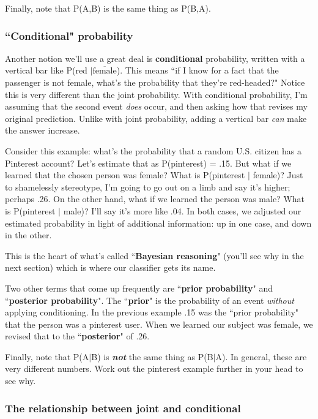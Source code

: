 \documentclass[12pt]{article}
\begin{document}
Finally, note that P(A,B) is the same thing as P(B,A).

\subsubsection{``Conditional" probability}

Another notion we'll use a great deal is \textbf{conditional} probability,
written with a vertical bar like P(red $| \overline{\textrm{female}}$). This
means ``if I know for a fact that the passenger is not female, what's the
probability that they're red-headed?" Notice this is very different than the
joint probability. With conditional probability, I'm assuming that the second
event \textit{does} occur, and then asking how that revises my original
prediction. Unlike with joint probability, adding a vertical bar \textit{can}
make the answer increase.

Consider this example: what's the probability that a random U.S. citizen has a
Pinterest account? Let's estimate that as P(pinterest) = .15. But what if we
learned that the chosen person was female? What is P(pinterest $|$ female)? Just
to shamelessly stereotype, I'm going to go out on a limb and say it's higher;
perhaps .26. On the other hand, what if we learned the person was male? What
is P(pinterest $|$ male)? I'll say it's more like .04. In both cases, we
adjusted our estimated probability in light of additional information: up in
one case, and down in the other.

This is the heart of what's called ``\textbf{Bayesian reasoning}" (you'll see
why in the next section) which is where our classifier gets its name.

Two other terms that come up frequently are ``\textbf{prior probability}" and
``\textbf{posterior probability}". The ``\textbf{prior}" is the probability of
an event \textit{without} applying conditioning. In the previous example .15
was the ``prior probability" that the person was a pinterest user. When we
learned our subject was female, we revised that to the ``\textbf{posterior}"
of .26.

Finally, note that P(A$|$B) is \textbf{\textit{not}} the same thing as
P(B$|$A). In general, these are very different numbers. Work out the pinterest
example further in your head to see why.

\subsubsection{The relationship between joint and conditional}
\end{document}
